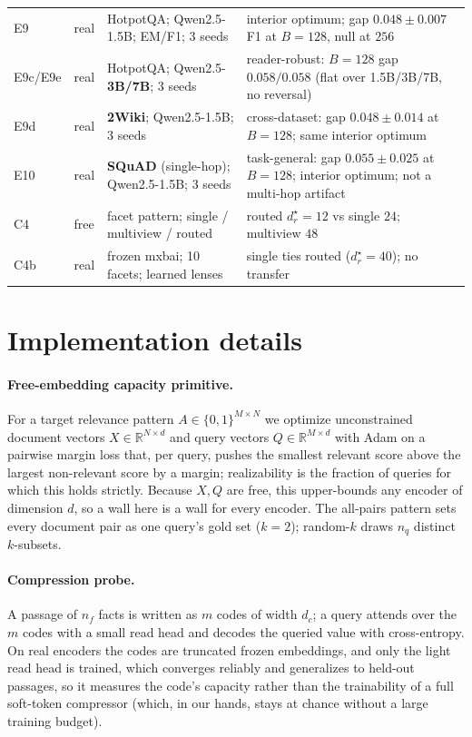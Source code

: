\documentclass{article}
\newcommand{\dr}{d_r}
\newcommand{\dc}{d_c}
\newcommand{\R}{\mathbb{R}}
\begin{document}
\begin{table}[h]
\begin{tabular}{@{}llp{4.4cm}p{4.6cm}@{}}
E9 & real & HotpotQA; Qwen2.5-1.5B; EM/F1; 3 seeds & interior optimum; gap $0.048{\pm}0.007$ F1 at $B{=}128$, null at $256$\\
E9c/E9e & real & HotpotQA; Qwen2.5-\textbf{3B/7B}; 3 seeds & reader-robust: $B{=}128$ gap $0.058/0.058$ (flat over 1.5B/3B/7B, no reversal)\\
E9d & real & \textbf{2Wiki}; Qwen2.5-1.5B; 3 seeds & cross-dataset: gap $0.048{\pm}0.014$ at $B{=}128$; same interior optimum\\
E10 & real & \textbf{SQuAD} (single-hop); Qwen2.5-1.5B; 3 seeds & task-general: gap $0.055{\pm}0.025$ at $B{=}128$; interior optimum; not a multi-hop artifact\\
C4 & free & facet pattern; single / multiview / routed & routed $\dr^\star{=}12$ vs single $24$; multiview $48$\\
C4b & real & frozen mxbai; 10 facets; learned lenses & single ties routed ($\dr^\star{=}40$); no transfer\\
\bottomrule
\end{tabular}
\end{table}

\section{Implementation details}
\label{app:impl}

\paragraph{Free-embedding capacity primitive.} For a target relevance pattern $A\in\{0,1\}^{M\times N}$
we optimize unconstrained document vectors $X\in\R^{N\times d}$ and query vectors $Q\in\R^{M\times d}$
with Adam on a pairwise margin loss that, per query, pushes the smallest relevant score above the
largest non-relevant score by a margin; realizability is the fraction of queries for which this
holds strictly. Because $X,Q$ are free, this upper-bounds any encoder of dimension $d$, so a wall
here is a wall for every encoder. The all-pairs pattern sets every document pair as one query's gold
set ($k{=}2$); random-$k$ draws $n_q$ distinct $k$-subsets.

\paragraph{Compression probe.} A passage of $n_f$ facts is written as $m$ codes of width $\dc$; a
query attends over the $m$ codes with a small read head and decodes the queried value with cross-entropy.
On real encoders the codes are truncated frozen embeddings, and only the light read head is trained,
which converges reliably and generalizes to held-out passages, so it measures the code's capacity
rather than the trainability of a full soft-token compressor (which, in our hands, stays at chance
without a large training budget).
\end{document}
